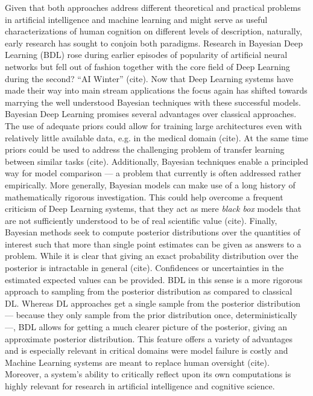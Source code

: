 \documentclass[10pt,a4paper,twocolumn]{article}
\begin{document}
Given that both approaches address different theoretical and practical problems in artificial intelligence and machine learning and might serve as useful characterizations of human cognition on different levels of description, naturally, early research has sought to conjoin both paradigms. Research in Bayesian Deep Learning (BDL) rose during earlier episodes of popularity of artificial neural networks but fell out of fashion together with the core field of Deep Learning during the second? ``AI Winter'' (cite). Now that Deep Learning systems have made their way into main stream applications the focus again has shifted towards marrying the well understood Bayesian techniques with these successful models. Bayesian Deep Learning promises several advantages over classical approaches. The use of adequate priors could allow for training large architectures even with relatively little available data, e.g. in the medical domain (cite). At the same time priors could be used to address the challenging problem of transfer learning between similar tasks (cite). Additionally, Bayesian techniques enable a principled way for model comparison --- a problem that currently is often addressed rather empirically. More generally, Bayesian models can make use of a long history of mathematically rigorous investigation. This could help overcome a frequent criticism of Deep Learning systems, that they act as mere \emph{black box} models that are not sufficiently understood to be of real scientific value (cite).
Finally, Bayesian methods seek to compute posterior distributions over the quantities of interest such that more than single point estimates can be given as answers to a problem. While it is clear that giving an exact probability distribution over the posterior is intractable in general (cite). 
Confidences or uncertainties in the estimated expected values can be provided.
BDL in this sense is a more rigorous approach to sampling from the posterior distribution as compared to classical DL. Whereas DL approaches get a single sample from the posterior distribution --- because they only sample from the prior distribution once, deterministically ---, BDL allows for getting a much clearer picture of the posterior, giving an approximate posterior distribution.
This feature offers a variety of advantages and is especially relevant in critical domains were model failure is costly and Machine Learning systems are meant to replace human oversight (cite). Moreover, a system's ability to critically reflect upon its own computations is highly relevant for research in artificial intelligence and cognitive science. 
\end{document}
